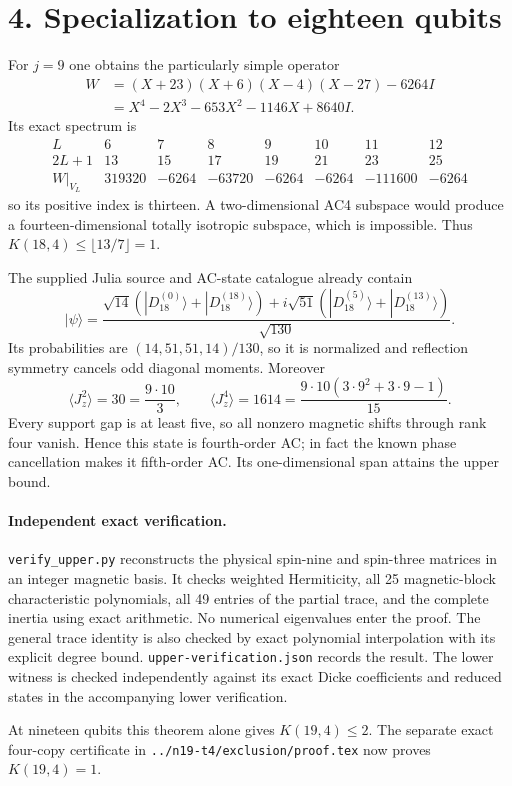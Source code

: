\documentclass[11pt]{article}
\begin{document}
\section*{4. Specialization to eighteen qubits}
For $j=9$ one obtains the particularly simple operator
\[
 \begin{aligned}
 W&=(X+23)(X+6)(X-4)(X-27)-6264 I\\
  &=X^4-2X^3-653X^2-1146X+8640 I.
 \end{aligned}
\]
Its exact spectrum is
\[
\begin{array}{c|rrrrrrr}
L&6&7&8&9&10&11&12\\\hline
2L+1&13&15&17&19&21&23&25\\
W|_{V_L}&319320&-6264&-63720&-6264&-6264&-111600&-6264
\end{array}
\]
so its positive index is thirteen. A two-dimensional AC4 subspace would
produce a fourteen-dimensional totally isotropic subspace, which is
impossible. Thus $K(18,4)\le\lfloor13/7\rfloor=1$.

The supplied Julia source and AC-state catalogue already contain
\[
 |\psi\rangle=\frac{\sqrt{14}(|D_{18}^{(0)}\rangle+|D_{18}^{(18)}\rangle)
 +i\sqrt{51}(|D_{18}^{(5)}\rangle+|D_{18}^{(13)}\rangle)}{\sqrt{130}}.
\]
Its probabilities are $(14,51,51,14)/130$, so it is normalized and
reflection symmetry cancels odd diagonal moments. Moreover
\[
 \langle J_z^2\rangle=30=\frac{9\cdot10}{3},\qquad
 \langle J_z^4\rangle=1614
 =\frac{9\cdot10(3\cdot9^2+3\cdot9-1)}{15}.
\]
Every support gap is at least five, so all nonzero magnetic shifts through
rank four vanish. Hence this state is fourth-order AC; in fact the known
phase cancellation makes it fifth-order AC. Its one-dimensional span
attains the upper bound.

\paragraph{Independent exact verification.}
\texttt{verify\_upper.py} reconstructs the physical spin-nine and
spin-three matrices in an integer magnetic basis. It checks weighted
Hermiticity, all 25 magnetic-block characteristic polynomials, all 49
entries of the partial trace, and the complete inertia using exact
arithmetic. No numerical eigenvalues enter the proof. The general trace
identity is also checked by exact polynomial interpolation with its
explicit degree bound. \texttt{upper-verification.json} records the result.
The lower witness is checked independently against its exact Dicke
coefficients and reduced states in the accompanying lower verification.

At nineteen qubits this theorem alone gives $K(19,4)\le2$. The separate exact four-copy certificate in \texttt{../n19-t4/exclusion/proof.tex} now proves $K(19,4)=1$.
\end{document}
